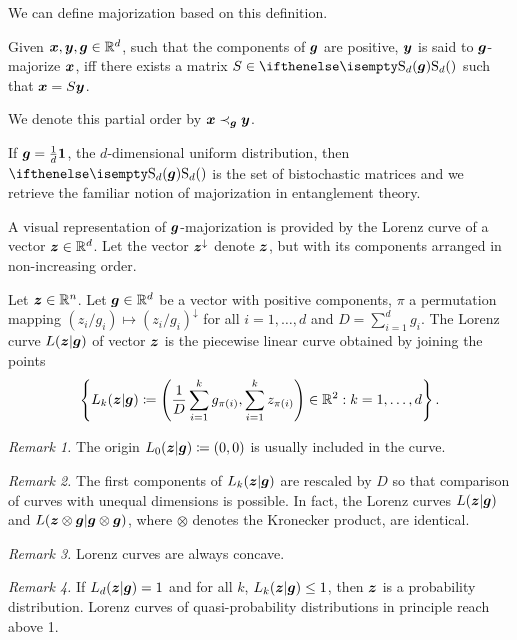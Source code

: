 We can define majorization based on this definition.
\begin{definition}\label{def:dmajor}
    Given $\bm{x}, \bm{y}, \bm{g} \in \mathbb{R}^d$, such that the components of $\bm{g}$ are positive, $\bm{y}$ is said to $\bm{g}$-majorize $\bm{x}$, iff there exists a matrix $S \in \stoch$ such that $\bm{x} = S\bm{y}$.
    
    We denote this partial order by $\bm{x} \prec_{\bm{g}} \bm{y}$.
\end{definition}
If $\bm{g} = \frac{1}{d}\bm{1}$, the $d$-dimensional uniform distribution, then $\stoch$ is the set of bistochastic matrices and we retrieve the familiar notion of majorization in entanglement theory. 

A visual representation of $\bm{g}$-majorization is provided by the Lorenz curve of a vector $\bm{z} \in \mathbb{R}^d$.
Let the vector $\bm{z}^\downarrow$ denote $\bm{z}$, but with its components arranged in non-increasing order.
\begin{definition}
    Let $\bm{z} \in \mathbb{R}^n$.
    Let $\bm{g} \in \mathbb{R}^d$ be a vector with positive components, $\pi$ a permutation mapping $(z_i/g_i) \mapsto (z_i/g_i)^\downarrow$ for all $i=1,\dots,d$ and $D = \sum_{i=1}^d g_i$.
    The Lorenz curve $L(\bm{z}|\bm{g})$ of vector $\bm{z}$ is the piecewise linear curve obtained by joining the points 
\begin{equation}\label{eq:lorenz}
    \left\{ L_k(\bm{z}|\bm{g}) \coloneqq \left( \frac{1}{D}\sum_{i=1}^k g_{\pi(i)}, \sum_{i=1}^k z_{\pi(i)} \right) \in \mathbb{R}^2: k = 1,\dots,d \right\}.
\end{equation}
\end{definition}
\emph{Remark 1.} The origin $L_0(\bm{z}|\bm{g}) \coloneqq (0,0)$ is usually included in the curve.

\emph{Remark 2.} The first components of $L_k(\bm{z}|\bm{g})$ are rescaled by $D$ so that comparison of curves with unequal dimensions is possible.
In fact, the Lorenz curves $L(\bm{z}|\bm{g})$ and $L(\bm{z} \otimes \bm{g}|\bm{g} \otimes \bm{g})$, where $\otimes$ denotes the Kronecker product, are identical.

\emph{Remark 3.} Lorenz curves are always concave.

\emph{Remark 4.} If $L_d(\bm{z}|\bm{g}) = 1$ and for all $k$, $L_k(\bm{z}|\bm{g}) \leq 1$, then $\bm{z}$ is a probability distribution.
Lorenz curves of quasi-probability distributions in principle reach above 1.


